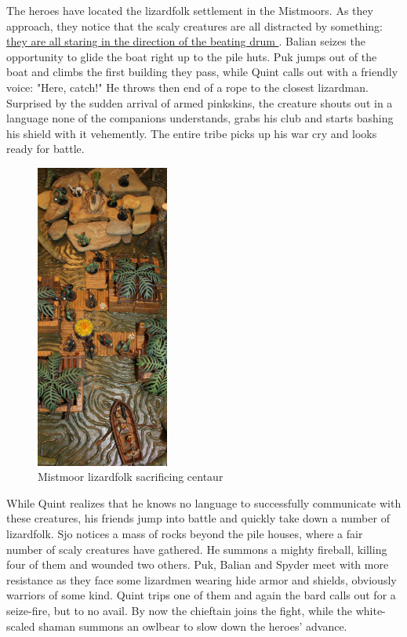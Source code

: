 The heroes have located the lizardfolk settlement in the Mistmoors. As they approach, they notice that the scaly creatures are all distracted by something:\hyperref[fig:Mistmoor-lizardfolk-sacrificing-centaur-543065415]{ they are all staring in the direction of the beating drum } . Balian seizes the opportunity to glide the boat right up to the pile huts. Puk jumps out of the boat and climbs the first building they pass, while Quint calls out with a friendly voice: "Here, catch!" He throws then end of a rope to the closest lizardman. Surprised by the sudden arrival of armed pinkskins, the creature shouts out in a language none of the companions understands, grabs his club and starts bashing his shield with it vehemently. The entire tribe picks up his war cry and looks ready for battle. \\

\begin{figure}[h]
	\centering
	\includegraphics[width=0.39\textwidth]{images/Mistmoor-lizardfolk-sacrificing-centaur-543065415.jpg}
	\caption{Mistmoor lizardfolk sacrificing centaur}
	\label{fig:Mistmoor-lizardfolk-sacrificing-centaur-543065415}
\end{figure}

While Quint realizes that he knows no language to successfully communicate with these creatures, his friends jump into battle and quickly take down a number of lizardfolk. Sjo notices a mass of rocks beyond the pile houses, where a fair number of scaly creatures have gathered. He summons a mighty fireball, killing four of them and wounded two others. Puk, Balian and Spyder meet with more resistance as they face some lizardmen wearing hide armor and shields, obviously warriors of some kind. Quint trips one of them and again the bard calls out for a seize-fire, but to no avail. By now the chieftain joins the fight, while the white-scaled shaman summons an owlbear to slow down the heroes' advance.\\


